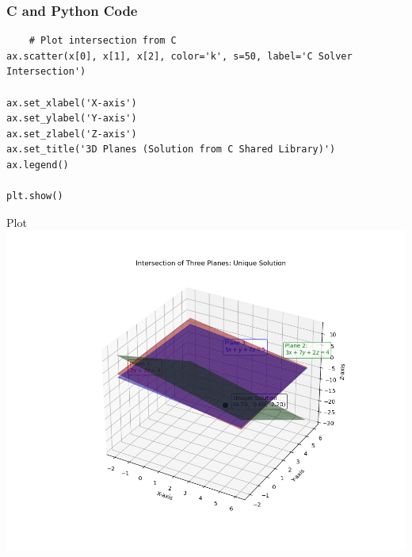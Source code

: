 \documentclass{beamer}
\begin{document}
\begin{frame}[fragile]
\frametitle{C and Python Code}
\begin{lstlisting}
    # Plot intersection from C
ax.scatter(x[0], x[1], x[2], color='k', s=50, label='C Solver Intersection')

ax.set_xlabel('X-axis')
ax.set_ylabel('Y-axis')
ax.set_zlabel('Z-axis')
ax.set_title('3D Planes (Solution from C Shared Library)')
ax.legend()

plt.show()

\end{lstlisting}
\end{frame}
\begin{frame}{Plot}
    \centering
    \includegraphics[width=\columnwidth, height=0.8\textheight, keepaspectratio]{Figure_23.png} 
\end{frame}
\end{document}
